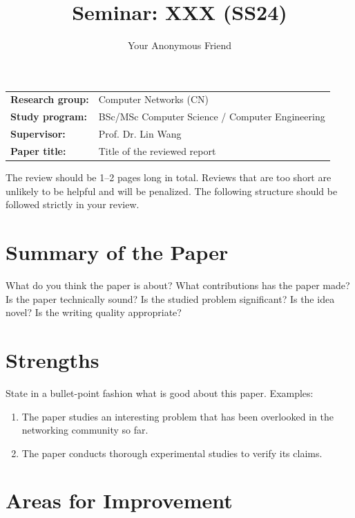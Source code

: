 \documentclass{upb-cn}
\title{Seminar: XXX (SS24)}
\author{Your Anonymous Friend}
\begin{document}
\maketitle

\begin{notebox}
    \begin{tabular}{@{}ll}
        \textbf{Research group:} & Computer Networks (CN) \\
        \textbf{Study program:} & BSc/MSc Computer Science / Computer Engineering \\
        \textbf{Supervisor:} & Prof. Dr. Lin Wang \\
        \textbf{Paper title:} & Title of the reviewed report
    \end{tabular}
\end{notebox}

The review should be 1--2 pages long in total. Reviews that are too short are unlikely to be helpful and will be penalized. The following structure should be followed strictly in your review.

\section{Summary of the Paper}
\label{sec:summary}

What do you think the paper is about? What contributions has the paper made? Is the paper technically sound? Is the studied problem significant? Is the idea novel? Is the writing quality appropriate?

\section{Strengths}
\label{sec:strengths}

State in a bullet-point fashion what is good about this paper. Examples:

\begin{enumerate}
    \item The paper studies an interesting problem that has been overlooked in the networking community so far.
    \item The paper conducts thorough experimental studies to verify its claims.
\end{enumerate}

\section{Areas for Improvement}
\label{sec:improvement}
\end{document}

